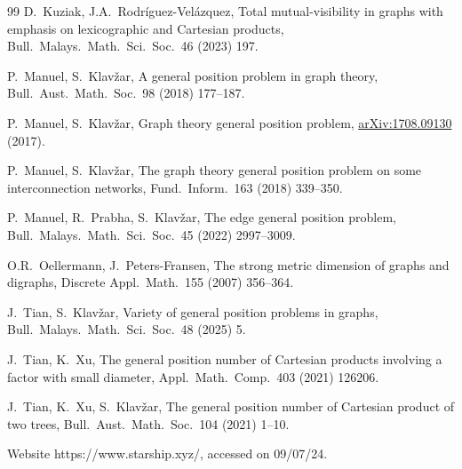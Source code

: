 \documentclass[a4paper,12pt]{article}
\theoremstyle{definition}
\begin{document}
\begin{thebibliography}{99}
		D.~Kuziak, J.A.~Rodr\'{i}guez-Vel\'{a}zquez, 
		Total mutual-visibility in graphs with emphasis on lexicographic and Cartesian products, 
		Bull.\ Malays.\ Math.\ Sci.\ Soc.\ 46 (2023) 197.
		
		P.~Manuel, S.~Klav\v{z}ar,
		A general position problem in graph theory,
		Bull.\ Aust.\ Math.\ Soc.\ 98 (2018) 177--187.
		
		P.~Manuel, S.~Klav\v{z}ar, 
		Graph theory general position problem,
		\url{arXiv:1708.09130} (2017).
		
		P.~Manuel, S.~Klav\v{z}ar, 
		The graph theory general position problem on some interconnection networks, 
		Fund.\ Inform.\ 163 (2018) 339--350. 
		
		P.~Manuel, R.~Prabha, S.~Klav\v{z}ar, 
		The edge general position problem, 
		Bull.\ Malays.\ Math.\ Sci.\ Soc.\ 45 (2022) 2997--3009.
		
		O.R.~Oellermann, J.~Peters-Fransen,
		The strong metric dimension of graphs and digraphs,
		Discrete Appl.\ Math.\ 155 (2007) 356--364.
		
		J.~Tian, S.~Klav\v{z}ar,
		Variety of general position problems in graphs, 
		Bull.\ Malays.\ Math.\ Sci.\ Soc.\ 48  (2025) 5.
		
		J.~Tian, K.~Xu, 
		The general position number of Cartesian products involving a factor with small diameter,
		Appl.\ Math.\ Comp.\ 403 (2021) 126206.
		
		J.~Tian, K.~Xu, S.~Klav\v{z}ar, 
		The general position number of Cartesian product of two trees, 
		Bull.\ Aust.\ Math.\ Soc.\ 104 (2021) 1--10.
		
		 Website https://www.starship.xyz/, accessed on 09/07/24.
		
	\end{thebibliography}
	
\end{document}
